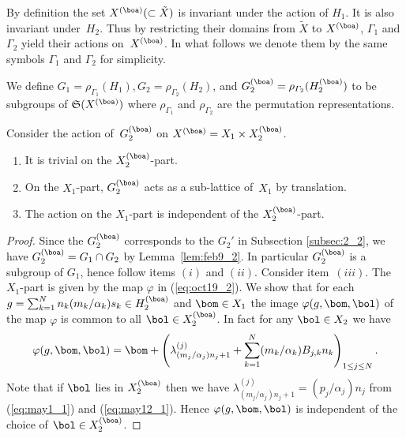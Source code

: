 By def\/inition the set $X^{(\boa)} (\subset \tilde{X})$ is invariant under the action of $H_1$.
It is also invariant under~$H_2$.
Thus by restricting their domains from $\tilde{X}$ to $X^{(\boa)}$, $\varGamma_1$ and $\varGamma_2$
yield their actions on~$X^{(\boa)}$.
In what follows we denote them by the same symbols $\varGamma_1$ and $\varGamma_2$
for simplicity.

We def\/ine
$G_1 = \rho_{\varGamma_1} (H_1), G_2 = \rho_{\varGamma_2} (H_2)$, and
$G_2^{(\boa)} = \rho_{\varGamma_2} (H_2^{(\boa)})$
to be subgroups of ${\frak S}(X^{(\boa)})$
where $\rho_{\varGamma_1}$ and $\rho_{\varGamma_2}$ are
the permutation representations.

\begin{lemma}\label{lem:oct19_1}
Consider the action of~$G_2^{(\boa)}$ on $X^{(\boa)}= X_1 \times X_2^{(\boa)}$.
\begin{enumerate}\itemsep=0pt
\item It is trivial on the $X_2^{(\boa)}$-part.
\item On the $X_1$-part, $G_2^{(\boa)}$ acts as a sub-lattice of~$X_1$ by translation.
\item The action on the $X_1$-part is independent of the $X_2^{(\boa)}$-part.
\end{enumerate}
\end{lemma}

\begin{proof}
Since the $G_2^{(\boa)}$ corresponds to the $G_2'$ in Subsection \ref{subsec:2_2}, we have
$G_2^{(\boa)} = G_1 \cap G_2$ by Lemma~\ref{lem:feb9_2}.
In particular $G_2^{(\boa)}$ is a subgroup of $G_1$, hence follow items $(i)$ and $(ii)$.
Consider item~$(iii)$.
The $X_1$-part is given by the map $\varphi$ in (\ref{eq:oct19_2}).
We show that
for each $g = \sum_{k=1}^N n_k (m_k/\alpha_k) s_k \in H_2^{(\boa)}$
and $\bom \in X_1$ the image $\varphi(g,\bom,\bol)$ of the map $\varphi$
is common to all $\bol \in X_2^{(\boa)}$.
In fact for any $\bol \in X_2$
we have
\begin{equation}\label{eq:may1_2}
\varphi(g,\bom,\bol) = \bom + \left(
\lambda^{(j)}_{(m_j/\alpha_j) n_j+1} + \sum_{k=1}^N (m_k/\alpha_k) B_{j,k} n_k
\right)_{1 \leq j \leq N}.
\end{equation}
Note that if $\bol$ lies in $X_2^{(\boa)}$ then we have $\lambda^{(j)}_{(m_j/\alpha_j) n_j+1} = (p_j/\alpha_j) n_j$ from
(\ref{eq:may1_1}) and (\ref{eq:may12_1}).
Hence
$\varphi(g,\bom,\bol)$ is independent of the choice of $\bol \in X_2^{(\boa)}$.
\end{proof}

